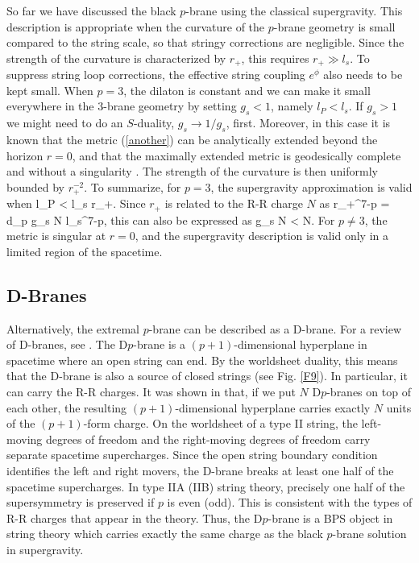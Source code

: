 So far we have discussed the black $p$-brane using the classical
supergravity. This description is appropriate when the curvature
of the $p$-brane geometry is small compared to the string scale,
so that stringy corrections are negligible. Since the strength 
of the curvature is characterized by $r_+$, this requires
 $r_+ \gg l_s$. 
To suppress string loop corrections, 
the effective string coupling $e^{\phi}$ also needs
to be kept small. When $p=3$,
the dilaton is constant and we can make it small
everywhere in the $3$-brane geometry by setting
$g_s < 1$, namely $l_P <l_s$. If $g_s>1$ we might need to do an 
$S$-duality, $g_s \rightarrow 1/g_s$, first. 
 Moreover, in this case it is known that 
the metric (\ref{another}) can be analytically
extended beyond the horizon $r=0$, and that
the maximally extended metric is
geodesically complete and without a singularity
\cite{Gibbons:1995vm}. 
The strength of the curvature is then
uniformly bounded by $r_+^{-2}$. 
To summarize, for $p=3$, the supergravity approximation is valid
when
\beq
   l_P < l_s \ll r_+.
\eeq
Since $r_+$ is related to the R-R charge $N$ as
\beq
     r_+^{7-p} = d_p g_s N l_s^{7-p},
\eeq
this can also be expressed
as
 \ll g_s N < N.
\label{hier1}
\eeq
For  $p \neq 3$, the metric is singular at $r=0$,
and the supergravity description is valid only 
in a limited region of the spacetime. 

\subsection{D-Branes}

Alternatively, the extremal $p$-brane can be
described as a D-brane. For a review of D-branes,
see \cite{Polchinski:1996na}.
The D$p$-brane is a $(p+1)$-dimensional hyperplane
in spacetime where an open string can end. 
By the worldsheet duality, this means that 
the D-brane is also a source of closed strings (see Fig. \ref{F9}).
In particular, it can carry the R-R charges.  
It was shown in  \cite{Polchinski:1995mt} that,
if we put $N$ D$p$-branes on top of each other,
the resulting $(p+1)$-dimensional hyperplane carries 
exactly $N$ units of the $(p+1)$-form charge. 
On the worldsheet of a type II string, the left-moving degrees
of freedom 
and the right-moving degrees of freedom 
carry separate spacetime supercharges.
Since the open string boundary condition identifies
the left and right movers,  
the D-brane breaks at least one half of the spacetime 
supercharges. In type IIA (IIB) string theory, 
precisely one half
of the supersymmetry is preserved if $p$ is even
(odd). This is consistent with the types of R-R charges
that appear in the theory. Thus, the D$p$-brane is a BPS 
object in string theory which carries 
exactly the same charge as the black $p$-brane
solution in supergravity. 
  
